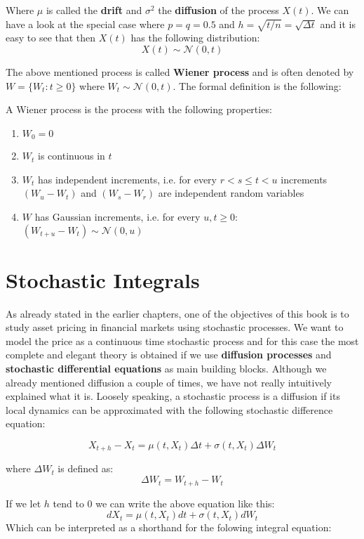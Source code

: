 \documentclass[times, utf8, diplomski]{fer}
\begin{document}
Where $\mu$ is called the \textbf{drift} and $\sigma^2$ the \textbf{diffusion} of the process $X(t)$. We can have a look at the special case where $p=q=0.5$ and $h=\sqrt{t/n}=\sqrt{\Delta t}$ and it is easy to see that then $X(t)$ has the following distribution:
$$ X(t) \sim \mathcal{N}(0, t) $$

\noindent The above mentioned process is called \textbf{Wiener process} and is often denoted by $W = \{W_t:t\ge 0\}$ where $W_t \sim \mathcal{N}(0,t)$. The formal definition is the following:

\begin{definition}
A Wiener process is the process with the following properties:
\begin{enumerate}
	\item $W_0 = 0$
	\item $W_t$ is continuous in $t$
	\item $W_t$ has independent increments, i.e. for every $r < s \leq t < u$ increments $(W_u - W_t)$ and $(W_s - W_r)$ are independent random variables
	\item $W$ has Gaussian increments, i.e. for every $u,t \geq 0$: $(W_{t+u} - W_t) \sim \mathcal{N}(0,u)$
\end{enumerate}
\end{definition}

\section{Stochastic Integrals}
As already stated in the earlier chapters, one of the objectives of this book is to study asset pricing in financial markets using stochastic processes. We want to model the price as a continuous time stochastic process and for this case the most complete and elegant theory is obtained if we use \textbf{diffusion processes} and \textbf{stochastic differential equations} as main building blocks. Although we already mentioned diffusion a couple of times, we have not really intuitively explained what it is. Loosely speaking, a stochastic process is a diffusion if its local dynamics can be approximated with the following stochastic difference equation:

$$ X_{t+h} - X_t = \mu(t,X_t)\Delta t + \sigma(t, X_t)\Delta W_t $$

\noindent where $\Delta W_t$ is defined as:
$$ \Delta W_t = W_{t+h} - W_t $$

\noindent If we let $h$ tend to $0$ we can write the above equation like this:
$$ dX_t = \mu(t,X_t)dt + \sigma(t, X_t)dW_t $$
\noindent Which can be interpreted as a shorthand for the folowing integral equation:
\end{document}
